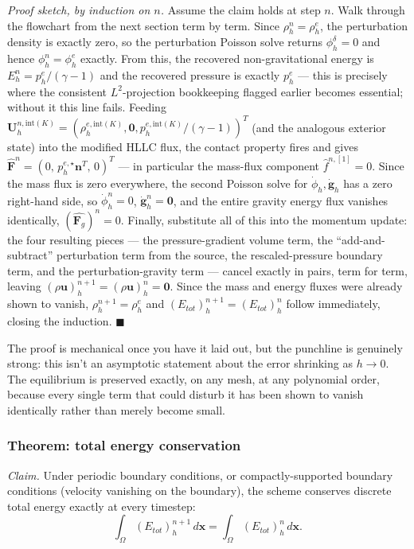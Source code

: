 \emph{Proof sketch, by induction on $n$.} Assume the claim holds at step $n$. Walk through the flowchart from the next section term by term. Since $\rho_h^n = \rho_h^e$, the perturbation density is exactly zero, so the perturbation Poisson solve returns $\phi_h^\delta = 0$ and hence $\phi_h^n = \phi_h^e$ exactly. From this, the recovered non-gravitational energy is $E_h^n = p_h^e/(\gamma-1)$ and the recovered pressure is exactly $p_h^e$ — this is precisely where the consistent $L^2$-projection bookkeeping flagged earlier becomes essential; without it this line fails. Feeding $\mathbf{U}_h^{n,\mathrm{int}(K)} = (\rho_h^{e,\mathrm{int}(K)},\mathbf{0},p_h^{e,\mathrm{int}(K)}/(\gamma-1))^T$ (and the analogous exterior state) into the modified HLLC flux, the contact property fires and gives $\widehat{\mathbf{F}}^n = (0,\, p_h^{e,\star}\mathbf{n}^T,\, 0)^T$ — in particular the mass-flux component $\widehat{f}^{n,[1]}=0$. Since the mass flux is zero everywhere, the second Poisson solve for $\dot\phi_h,\dot{\mathbf{g}}_h$ has a zero right-hand side, so $\dot\phi_h^n = 0$, $\dot{\mathbf{g}}_h^n = \mathbf{0}$, and the entire gravity energy flux vanishes identically, $(\widehat{\mathbf{F}_g})^n = 0$. Finally, substitute all of this into the momentum update: the four resulting pieces — the pressure-gradient volume term, the ``add-and-subtract'' perturbation term from the source, the rescaled-pressure boundary term, and the perturbation-gravity term — cancel exactly in pairs, term for term, leaving $(\rho\mathbf{u})_h^{n+1} = (\rho\mathbf{u})_h^n = \mathbf{0}$. Since the mass and energy fluxes were already shown to vanish, $\rho_h^{n+1}=\rho_h^e$ and $(E_{tot})_h^{n+1} = (E_{tot})_h^n$ follow immediately, closing the induction. $\blacksquare$

The proof is mechanical once you have it laid out, but the punchline is genuinely strong: this isn't an asymptotic statement about the error shrinking as $h\to0$. The equilibrium is preserved exactly, on any mesh, at any polynomial order, because every single term that could disturb it has been shown to vanish identically rather than merely become small.

\subsubsection{Theorem: total energy conservation}

\emph{Claim.} Under periodic boundary conditions, or compactly-supported boundary conditions (velocity vanishing on the boundary), the scheme conserves discrete total energy exactly at every timestep:
\[
	\int_\Omega (E_{tot})_h^{n+1}\, d\mathbf{x} = \int_\Omega (E_{tot})_h^n\, d\mathbf{x}.
\]

